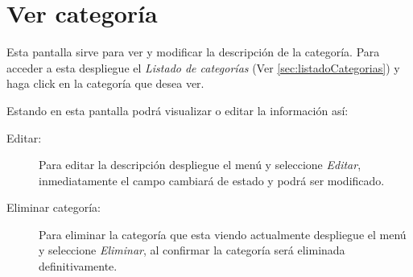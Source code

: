 \section{Ver categor\'ia}
\label{sec:verCategoria}
Esta pantalla sirve para ver y modificar la descripci\'on de la categor\'ia.
Para acceder a esta despliegue el \emph{Listado de categor\'ias}
(Ver \ref{sec:listadoCategorias}) y haga click en la categor\'ia que desea ver.

Estando en esta pantalla podr\'a visualizar o editar la informaci\'on as\'i:

\begin{description}
\item[Editar:]Para editar la descripci\'on despliegue el men\'u \blackberry
y seleccione \emph{Editar}, inmediatamente el campo cambiar\'a de estado
y podr\'a ser modificado.
\item[Eliminar categor\'ia:]Para eliminar la categor\'ia que esta viendo
actualmente despliegue el men\'u \blackberry y seleccione \emph{Eliminar}, al
confirmar la categor\'ia ser\'a eliminada definitivamente.
\end{description}

\guardarVer